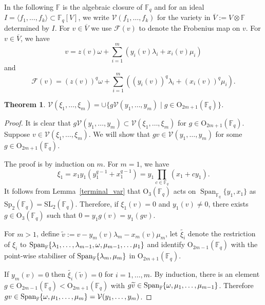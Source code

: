 \documentclass{amsart}
\newtheorem{theorem}[subsection]{Theorem}
\newcommand{\field}{\mathbb{F}}
\newcommand{\SL}[2]{{{\text{SL}_{{#1}}(\field_{#2})}}}
\newcommand{\syp}[2]{{{\text{Sp}_{{#1}}(\field_{#2})}}}
\newcommand{\orth}[2]{{{\text{O}_{{#1}}(\field_{#2})}}}
\newcommand{\V}{\mathcal{V}}
\newcommand{\frob}{\mathcal{F}}
\newcommand{\basise}{\lambda}
\newcommand{\basisf}{\mu}
\DeclareMathOperator{\Span}{Span}
\begin{document}
In the following $\field$ is the algebraic closure of $\field_q$ and for an ideal $I=\langle f_1,\ldots,f_k\rangle\subset\field_q[V]$, we write
$\V(f_1,\ldots,f_k)$ for the variety in 
$\overline{V}:=V\otimes\field$ determined by $I$.
For $v\in \overline{V}$ we use $\frob(v)$ to denote the  Frobenius map on $v$. For $v\in\overline{V}$, we have
$$v=z(v)\omega+\sum_{i=1}^m(y_i(v)\basise_i+x_i(v)\basisf_i)$$
and
$$\frob(v)=(z(v))^q\omega+\sum_{i=1}^m\left((y_i(v))^q\basise_i+(x_i(v))^q\basisf_i\right).$$


\begin{theorem} \label{thm-var-sp} 
$\V(\xi_1,\ldots,\xi_{m})=
\cup\{g\V(y_1,\ldots,y_m)\mid g\in\orth{2m+1}{q}\}$.
\end{theorem}
\begin{proof} It is clear that 
$g\V(y_1,\ldots,y_m)\subset \V(\xi_1,\ldots,\xi_{m})$ for $g\in\orth{2m+1}{q}$. Suppose $v\in \V(\xi_1,\ldots,\xi_{m})$. We will show that
$gv\in \V(y_1,\ldots,y_m)$ for some $g\in\orth{2m+1}{q}$.

The proof is by induction on $m$. For $m=1$, we have 
$$\xi_1=x_1y_1(y_1^{q-1}+x_1^{q-1})=y_1\prod_{c\in\field_q}(x_1+cy_1).$$
It follows from Lemma~\ref{terminal_var} that $\orth{3}{q}$ acts 
on $\Span_{\field_q}\{y_1,x_1\}$ as $\syp{2}{q}=\SL{2}{q}$.
Therefore, if $\xi_1(v)=0$ and $y_1(v)\not=0$, there exists $g\in\orth{3}{q}$
such that $0=y_1g(v)=y_1(gv)$.


For $m>1$, define $\widetilde{v}:=v-y_m(v)\basise_m-x_m(v)\basisf_m$, let
$\widetilde{\xi_i}$ denote the restriction of $\xi_i$ to 
${\rm Span}_{\field}\{\basise_1,\ldots,\basise_{m-1},\omega,\basisf_{m-1},\ldots \basisf_1\}$  and
identify $\orth{2m-1}{q}$ with the point-wise stabiliser of  
${\rm Span}_{\field}\{\basise_m,\basisf_m\}$ in $\orth{2m+1}{q}$.

If $y_m(v)=0$ then $\widetilde{\xi_i}(\widetilde{v})=0$ for $i=1,\ldots,m$. By induction, there is an element $g\in\orth{2m-1}{q}<\orth{2m+1}{q}$
with $g\widetilde{v}\in 
{\rm Span}_{\field}\{\omega,\basisf_1,\ldots,\basisf_{m-1}\}$. 
Therefore $gv\in {\rm Span}_{\field}\{\omega,\basisf_1,\ldots,\basisf_m\}
=\V(y_1,\ldots,y_m)$.


\end{proof}
\end{document}

